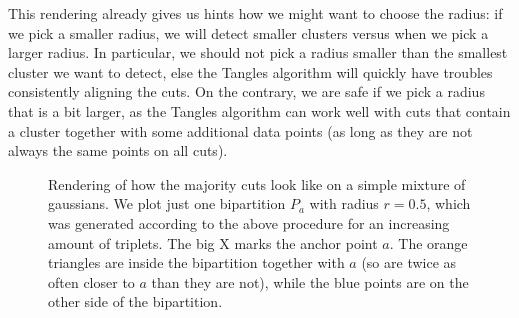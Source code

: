 This rendering already gives us hints how we might want to choose the radius: if we pick a smaller radius, we will detect smaller clusters versus when we pick a larger radius. 
In particular, we should not pick a radius smaller than the smallest cluster we want to detect, else the Tangles algorithm will quickly have troubles consistently aligning
the cuts. On the contrary, we are safe if we pick a radius that is a bit larger, as the Tangles algorithm can work well with cuts that contain a cluster together with some additional data points 
(as long as they are not always the same points on all cuts).

\onecolumn
\begin{figure}[ht]
    \centering
    \subfloat[500 triplets]{%
      \resizebox{0.5\textwidth}{!}{}
  }
    \subfloat[5000 triplets]{%
      \resizebox{0.5\textwidth}{!}{}}
    \hfill
    \subfloat[20000 triplets]{%
      \resizebox{0.5\textwidth}{!}{}}
    \caption{Rendering of how the majority cuts look like on a simple mixture of gaussians. We plot just one bipartition $P_a$ with radius $r=0.5$, which was generated
        according to the above procedure for an increasing amount of triplets. The big X marks the anchor point $a$. 
        The orange triangles are inside the bipartition together with $a$ (so are twice as often closer to $a$ than they are not), 
    while the blue points are on the other side of the bipartition.}
    \label{fig:majority_cut}
\end{figure}
